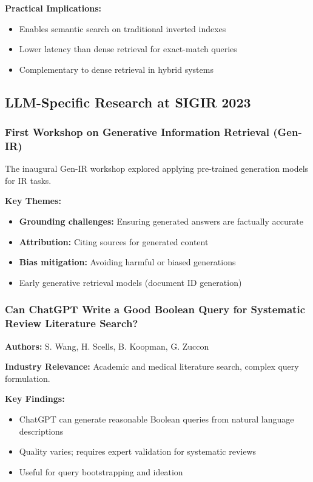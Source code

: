 \documentclass[11pt,letterpaper]{article}
\begin{document}
\textbf{Practical Implications:}
\begin{itemize}[leftmargin=*]
    \item Enables semantic search on traditional inverted indexes
    \item Lower latency than dense retrieval for exact-match queries
    \item Complementary to dense retrieval in hybrid systems
\end{itemize}

\subsection{LLM-Specific Research at SIGIR 2023}

\subsubsection{First Workshop on Generative Information Retrieval (Gen-IR)}

The inaugural Gen-IR workshop explored applying pre-trained generation models for IR tasks.

\textbf{Key Themes:}
\begin{itemize}[leftmargin=*]
    \item \textbf{Grounding challenges:} Ensuring generated answers are factually accurate
    \item \textbf{Attribution:} Citing sources for generated content
    \item \textbf{Bias mitigation:} Avoiding harmful or biased generations
    \item Early generative retrieval models (document ID generation)
\end{itemize}

\subsubsection{Can ChatGPT Write a Good Boolean Query for Systematic Review Literature Search?}
\textbf{Authors:} S. Wang, H. Scells, B. Koopman, G. Zuccon

\textbf{Industry Relevance:} Academic and medical literature search, complex query formulation.

\textbf{Key Findings:}
\begin{itemize}[leftmargin=*]
    \item ChatGPT can generate reasonable Boolean queries from natural language descriptions
    \item Quality varies; requires expert validation for systematic reviews
    \item Useful for query bootstrapping and ideation
\end{itemize}
\end{document}
